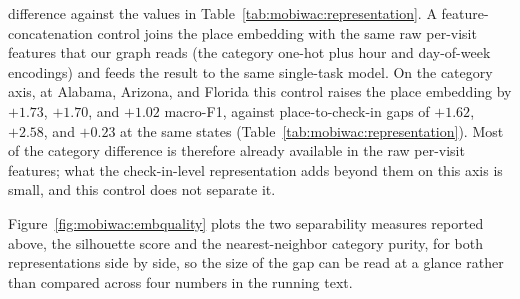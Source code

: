 difference against the values in Table~\ref{tab:mobiwac:representation}. A feature-concatenation control joins the place embedding with the same raw
per-visit features that our graph reads (the category one-hot plus hour and
day-of-week encodings) and feeds the result to the same single-task model. On
the category axis, at Alabama, Arizona, and Florida this control raises the
place embedding by $+1.73$, $+1.70$, and $+1.02$ macro-F1, against
place-to-check-in gaps of $+1.62$, $+2.58$, and $+0.23$ at the same states
(Table~\ref{tab:mobiwac:representation}). Most of the category difference is
therefore already available in the raw per-visit features; what the
check-in-level representation adds beyond them on this axis is small, and this
control does not separate it.

\providecommand{\sd}[1]{\,{\scriptsize$\pm$#1}}


Figure~\ref{fig:mobiwac:embquality} plots the two separability measures reported above, the
silhouette score and the nearest-neighbor category purity, for both representations side by
side, so the size of the gap can be read at a glance rather than compared across four numbers
in the running text.

